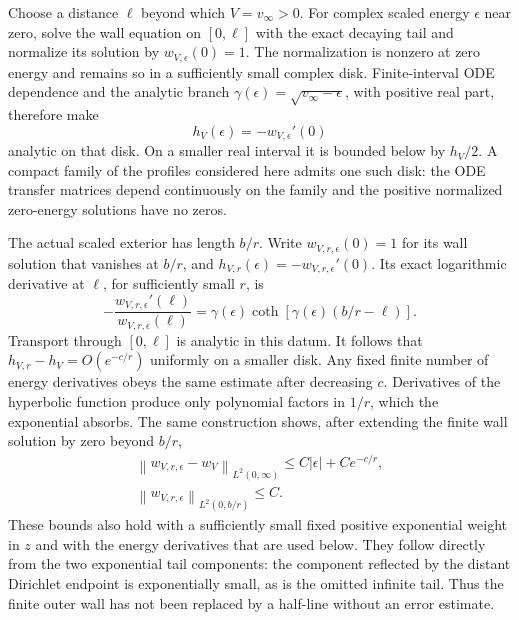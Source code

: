 \documentclass[aps,pra,reprint,superscriptaddress,longbibliography]{revtex4-2}
\newcommand{\norm}[1]{\left\lVert#1\right\rVert}
\begin{document}
Choose a distance $\ell$ beyond which $V=v_\infty>0$. For complex scaled
energy $\epsilon$ near zero, solve the wall equation on $[0,\ell]$ with the
exact decaying tail and normalize its solution by
$w_{V,\epsilon}(0)=1$. The normalization is nonzero at zero energy and
remains so in a sufficiently small complex disk. Finite-interval ODE
dependence and the analytic branch
$\gamma(\epsilon)=\sqrt{v_\infty-\epsilon}$, with positive real part,
therefore make
\begin{equation}
 h_V(\epsilon)=-w_{V,\epsilon}'(0)
 \label{eq:coreweyl}
\end{equation}
analytic on that disk. On a smaller real interval it is bounded below by
$h_V/2$. A compact family of the profiles considered here admits one such
disk: the ODE transfer matrices depend continuously on the family and the
positive normalized zero-energy solutions have no zeros.

The actual scaled exterior has length $b/r$. Write
$w_{V,r,\epsilon}(0)=1$ for its wall solution that vanishes at $b/r$, and
$h_{V,r}(\epsilon)=-w_{V,r,\epsilon}'(0)$. Its exact logarithmic derivative
at $\ell$, for sufficiently small $r$, is
\begin{equation}
 -\frac{w_{V,r,\epsilon}'(\ell)}{w_{V,r,\epsilon}(\ell)}
 =\gamma(\epsilon)
       \coth\!\left[\gamma(\epsilon)(b/r-\ell)\right].
 \label{eq:corecoth}
\end{equation}
Transport through $[0,\ell]$ is analytic in this datum. It follows that
$h_{V,r}-h_V=O(e^{-c/r})$ uniformly on a smaller disk. Any fixed finite
number of energy derivatives obeys the same estimate after decreasing
$c$. Derivatives of the hyperbolic function produce only polynomial
factors in $1/r$, which the exponential absorbs. The same construction
shows, after extending the finite wall solution by zero beyond $b/r$,
\begin{equation}
 \begin{gathered}
 \norm{w_{V,r,\epsilon}-w_V}_{L^2(0,\infty)}
 \le C|\epsilon|+Ce^{-c/r},\\
 \norm{w_{V,r,\epsilon}}_{L^2(0,b/r)}\le C.
 \end{gathered}
 \label{eq:corewallnorm}
\end{equation}
These bounds also hold with a sufficiently small fixed positive exponential
weight in $z$ and with the energy derivatives that are used below. They
follow directly from the two exponential tail components: the component
reflected by the distant Dirichlet endpoint is exponentially small, as is
the omitted infinite tail. Thus the finite outer wall has not been
replaced by a half-line without an error estimate.
\end{document}
